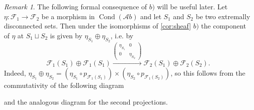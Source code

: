 \documentclass[11pt,A4]{article}
\theoremstyle{plain}
\theoremstyle{definition}
\theoremstyle{remark}
\newtheorem{rem}[thm]{Remark}
\newcommand{\1}{\mathbbm{1}}
\newcommand{\F}{\mathcal{F}}
\newcommand{\Ab}{\mathscr{A}b}
\DeclareMathOperator{\Cond}{Cond}
\newcommand{\op}{\oplus}
\begin{document}
\begin{rem}\label{rem:sumcomponent}
    The following formal consequence of $b)$ will be useful later.
    Let $\eta\colon \F_{1}\to \F_{2}$ be a morphism in $\Cond(\Ab)$ and let $S_{1}$ and $S_{2}$ be two extremally disconnected sets.
    Then under the isomorphisms of \cref{cor:sheaf} $b)$ the component of $\eta$ at $S_{1}\sqcup S_{2}$ is given by $\eta_{S_{1}}\op \eta_{S_{2}}$, i.e. by
    \[ \F_{1}(S_{1})\op \F_{1}(S_{1})\xrightarrow{\begin{pmatrix} \eta_{S_{1}} & 0 \\ 0 & \eta_{S_{2}} \end{pmatrix}} \F_{2}(S_{1})\op \F_{2}(S_{2}).\]
	Indeed, $\eta_{S_{1}}\op \eta_{S_{2}}=(\eta_{S_{1}}\circ p_{\F_{1}(S_{1})})\times (\eta_{S_{2}}\circ p_{\F_{1}(S_{2})})$, so this follows from the commutativity of the following diagram
	\begin{center}
	\end{center}
	and the analogous diagram for the second projections.
\end{rem}
\end{document}
